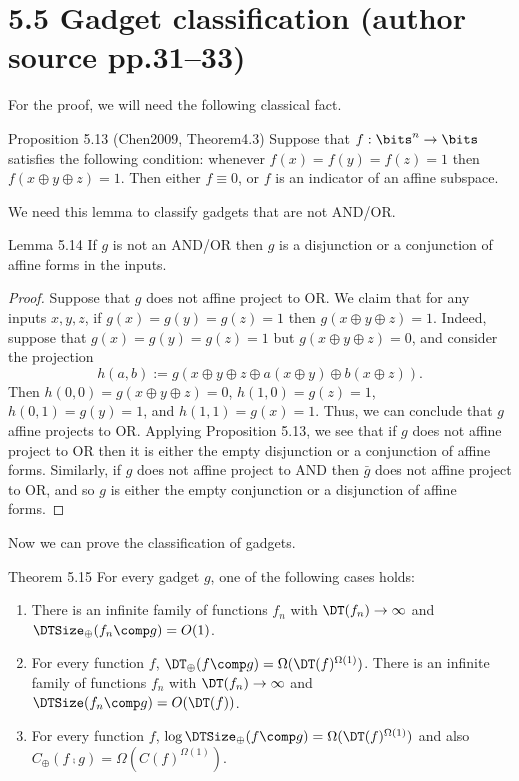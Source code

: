 \section*{5.5 Gadget classification (author source pp.31--33)}
For the proof, we will need the following classical fact.
\begin{originalresult}{Proposition 5.13 (Chen2009, Theorem4.3)}
Suppose that $f:\bits^n\to\bits$ satisfies the following condition: whenever $f(x)=f(y)=f(z)=1$ then $f(x\oplus y\oplus z)=1$. Then either $f\equiv0$, or $f$ is an indicator of an affine subspace.
\end{originalresult}
We need this lemma to classify gadgets that are not AND/OR.
\begin{originalresult}{Lemma 5.14}
If $g$ is not an AND/OR then $g$ is a disjunction or a conjunction of affine forms in the inputs.
\end{originalresult}
\begin{proof}
Suppose that $g$ does not affine project to OR. We claim that for any inputs $x,y,z$, if $g(x)=g(y)=g(z)=1$ then $g(x\oplus y\oplus z)=1$. Indeed, suppose that $g(x)=g(y)=g(z)=1$ but $g(x\oplus y\oplus z)=0$, and consider the projection
\[h(a,b):=g(x\oplus y\oplus z\oplus a(x\oplus y)\oplus b(x\oplus z)).\]
Then $h(0,0)=g(x\oplus y\oplus z)=0$, $h(1,0)=g(z)=1$, $h(0,1)=g(y)=1$, and $h(1,1)=g(x)=1$. Thus, we can conclude that $g$ affine projects to OR.
Applying Proposition 5.13, we see that if $g$ does not affine project to OR then it is either the empty disjunction or a conjunction of affine forms. Similarly, if $g$ does not affine project to AND then $\bar g$ does not affine project to OR, and so $g$ is either the empty conjunction or a disjunction of affine forms.
\end{proof}
Now we can prove the classification of gadgets.
\begin{originalresult}{Theorem 5.15}
For every gadget $g$, one of the following cases holds:
\begin{enumerate}
\item[(i)] There is an infinite family of functions $f_n$ with $\DT(f_n)\to\infty$ and $\DTSize_\oplus(f_n\comp g)=O(1)$.
\item[(ii)] For every function $f$, $\DT_\oplus(f\comp g)=\Omega(\DT(f)^{\Omega(1)})$. There is an infinite family of functions $f_n$ with $\DT(f_n)\to\infty$ and $\DTSize(f_n\comp g)=O(\DT(f))$.
\item[(iii)] For every function $f$, $\log\DTSize_\oplus(f\comp g)=\Omega(\DT(f)^{\Omega(1)})$ and also $C_\oplus(f\comp g)=\Omega(C(f)^{\Omega(1)})$.
\end{enumerate}
\end{originalresult}
